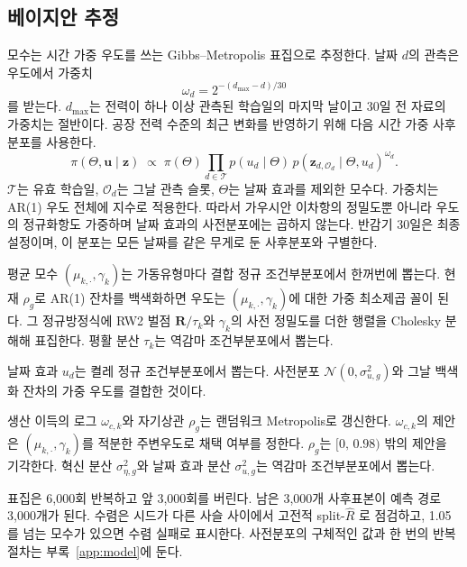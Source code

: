 \subsection{베이지안 추정}
\label{sec:ch2-estimation}

모수는 시간 가중 우도를 쓰는 Gibbs--Metropolis 표집으로 추정한다. 날짜 $d$의 관측은 우도에서 가중치
\begin{equation}
\omega_d = 2^{-(d_{\max}-d)/30}
\label{eq:ch2-weight}
\end{equation}
를 받는다. $d_{\max}$는 전력이 하나 이상 관측된 학습일의 마지막 날이고 30일 전 자료의 가중치는 절반이다. 공장 전력 수준의 최근 변화를 반영하기 위해 다음 시간 가중 사후분포를 사용한다.
\begin{equation}
\pi(\Theta,\boldsymbol u\mid\boldsymbol z)
\;\propto\;\pi(\Theta)\prod_{d\in\mathcal T}
p(u_d\mid\Theta)\,
p(\boldsymbol z_{d,\mathcal O_d}\mid\Theta,u_d)^{\omega_d}.
\label{eq:ch2-weighted-posterior}
\end{equation}
$\mathcal T$는 유효 학습일, $\mathcal O_d$는 그날 관측 슬롯, $\Theta$는 날짜 효과를 제외한 모수다. 가중치는 AR(1) 우도 전체에 지수로 적용한다. 따라서 가우시안 이차항의 정밀도뿐 아니라 우도의 정규화항도 가중하며 날짜 효과의 사전분포에는 곱하지 않는다. 반감기 30일은 최종 설정이며, 이 분포는 모든 날짜를 같은 무게로 둔 사후분포와 구별한다.

평균 모수 $(\mu_{k,\cdot},\gamma_k)$는 가동유형마다 결합 정규 조건부분포에서 한꺼번에 뽑는다. 현재 $\rho_g$로 AR(1) 잔차를 백색화하면 우도는 $(\mu_{k,\cdot},\gamma_k)$에 대한 가중 최소제곱 꼴이 된다. 그 정규방정식에 RW2 벌점 $\mathbf R/\tau_k$와 $\gamma_k$의 사전 정밀도를 더한 행렬을 Cholesky 분해해 표집한다. 평활 분산 $\tau_k$는 역감마 조건부분포에서 뽑는다.

날짜 효과 $u_d$는 켤레 정규 조건부분포에서 뽑는다. 사전분포 $\mathcal N(0,\sigma^2_{u,g})$와 그날 백색화 잔차의 가중 우도를 결합한 것이다.

생산 이득의 로그 $\omega_{c,k}$와 자기상관 $\rho_g$는 랜덤워크 Metropolis로 갱신한다. $\omega_{c,k}$의 제안은 $(\mu_{k,\cdot},\gamma_k)$를 적분한 주변우도로 채택 여부를 정한다. $\rho_g$는 $[0,\,0.98)$ 밖의 제안을 기각한다. 혁신 분산 $\sigma^2_{\eta,g}$와 날짜 효과 분산 $\sigma^2_{u,g}$는 역감마 조건부분포에서 뽑는다.

표집은 6,000회 반복하고 앞 3,000회를 버린다. 남은 3,000개 사후표본이 예측 경로 3,000개가 된다. 수렴은 시드가 다른 사슬 사이에서 고전적 split-$\widehat R$ \citep{gelman1992rhat}로 점검하고, 1.05를 넘는 모수가 있으면 수렴 실패로 표시한다. 사전분포의 구체적인 값과 한 번의 반복 절차는 부록~\ref{app:model}에 둔다.

